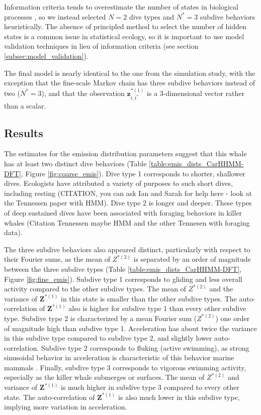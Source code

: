 Information criteria tends to overestimate the number of states in biological processes \citep{Pohle:2017}, so we instead selected $N = 2$ dive types and $N^* = 3$ subdive behaviors heuristically. The absence of principled method to select the number of hidden states is a common issue in statistical ecology, so it is important to use model validation techniques in lieu of information criteria (see section \ref{subsec:model_validation}).

The final model is nearly identical to the one from the simulation study, with the exception that the fine-scale Markov chain has three subdive behaviors instead of two ($N^* = 3$), and that the observation $\mathbf{z}^{*(1)}_{t,t^*}$ is a 3-dimensional vector rather than a scalar.

\subsection{Results}

The estimates for the emission distribution parameters suggest that this whale has at least two distinct dive behaviors (Table \ref{table:emis_dists_CarHHMM-DFT}, Figure \ref{fig:coarse_emis}). Dive type 1 corresponds to shorter, shallower dives. Ecologists have attributed a variety of purposes to such short dives, including resting (CITATION, you can ask Ian and Sarah for help here - look at the Tennessen paper with HMM). Dive type 2 is longer and deeper. These types of deep sustained dives have been associated with foraging behaviors in killer whales (Citation Tennessen maybe HMM and the other Tennesen with foraging data).

The three subdive behaviors also appeared distinct, particularly with respect to their Fourier sums, as the mean of $Z^{*(2)}$ is separated by an order of magnitude between the three subdive types (Table \ref{table:emis_dists_CarHHMM-DFT},  Figure  \ref{fig:fine_emis}). Subdive type 1 corresponds to gliding and less overall activity compared to the other subdive types. The mean of $Z^{*(2)}$ and the variance of $\mathbf{Z}^{*(1)}$ in this state is smaller than the other subdive types. The auto-correlation of $\mathbf{Z}^{*(1)}$ also is higher for subdive type 1 than every other subdive type.
Subdive type 2 is characterized by a mean Fourier sum ($Z^{*(2)}$) one order of magnitude high than subdive type 1. Acceleration has about twice the variance in this subdive type compared to subdive type 2, and slightly lower auto-correlation. Subdive type 2 corresponds to fluking (active swimming), as strong sinusoidal behavior in acceleration is characteristic of this behavior marine mammals \citep{Simon:2012}.
Finally, subdive type 3 corresponds to vigorous swimming activity, especially as the killer whale submerges or surfaces. The mean of $Z^{*(2)}$ and variance of $\mathbf{Z}^{*(1)}$ is much higher in subdive type 3 compared to every other state. The auto-correlation of $\mathbf{Z}^{*(1)}$ is also much lower in this subdive type, implying more variation in acceleration.

